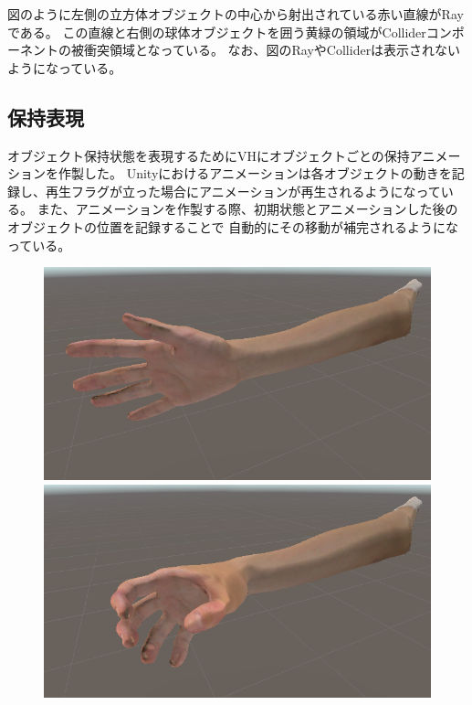 \documentclass{ltjsreport}
\begin{document}
				図のように左側の立方体オブジェクトの中心から射出されている赤い直線がRayである。
				この直線と右側の球体オブジェクトを囲う黄緑の領域がColliderコンポーネントの被衝突領域となっている。
				なお、図のRayやColliderは表示されないようになっている。

		\subsection{保持表現}
			オブジェクト保持状態を表現するためにVHにオブジェクトごとの保持アニメーションを作製した。
			Unityにおけるアニメーションは各オブジェクトの動きを記録し、再生フラグが立った場合にアニメーションが再生されるようになっている。
			また、アニメーションを作製する際、初期状態とアニメーションした後のオブジェクトの位置を記録することで
			自動的にその移動が補完されるようになっている。
			\begin{figure}[H]
			\centering
			\begin{minipage}{0.45\columnwidth}
			\centering
			\includegraphics[width = \columnwidth]{../figs/nutralHand.png}
			\end{minipage}
			\hspace{0.04\columnwidth}
			\begin{minipage}{0.45\columnwidth}
			\centering
			\includegraphics[width = \columnwidth]{../figs/grapsphereHand.png}
			\end{minipage}
			\caption{}
			\end{figure}
\end{document}
